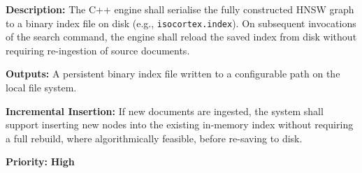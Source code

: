 \documentclass[12pt, a4paper]{article}
\begin{document}
\vspace{0.4cm}

\begin{tcolorbox}[enhanced, colback=white, colframe=ctPurple,
    colbacktitle=ctLightPurple, coltitle=ctPurple, boxrule=0.5pt,
    leftrule=4pt, arc=2mm, fonttitle=\large\bfseries,
    title={FR-7: Index Persistence},
    drop fuzzy shadow=black!5!white, top=2pt, bottom=2pt]
\begin{prolist}
    \item \textbf{Description:} The C++ engine shall serialise the fully
    constructed HNSW graph to a binary index file on disk
    (e.g., \texttt{isocortex.index}). On subsequent invocations of the
    search command, the engine shall reload the saved index from disk
    without requiring re-ingestion of source documents.

    \item \textbf{Outputs:} A persistent binary index file written to a
    configurable path on the local file system.

    \item \textbf{Incremental Insertion:} If new documents are ingested, the
    system shall support inserting new nodes into the existing in-memory
    index without requiring a full rebuild, where algorithmically feasible,
    before re-saving to disk.

    \item \textbf{Priority:} \textcolor{alertRed}{\textbf{High}}
\end{prolist}
\end{tcolorbox}

\vspace{0.4cm}
\end{document}
